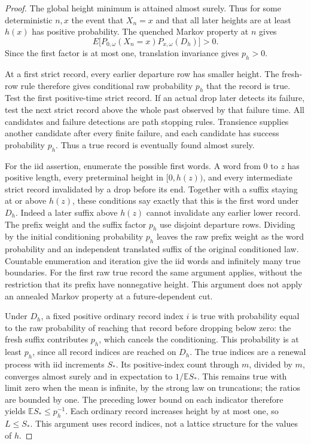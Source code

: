 \begin{proof}
The global height minimum is attained almost surely. Thus for some
deterministic \(n,x\) the event that \(X_n=x\) and that all later heights
are at least \(h(x)\) has positive probability. The quenched Markov
property at \(n\) gives
\[
E\big[P_{0,\omega}(X_n=x)P_{x,\omega}(D_h)\big]>0.
\]
Since the first factor is at most one, translation invariance gives
\(p_h>0\).

At a first strict record, every earlier departure row has smaller height.
The fresh-row rule therefore gives conditional raw probability \(p_h\)
that the record is true. Test the first positive-time strict record. If
an actual drop later detects its failure, test the next strict record
above the whole past observed by that failure time. All candidates and
failure detections are path stopping rules. Transience supplies another
candidate after every finite failure, and each candidate has success
probability \(p_h\). Thus a true record is eventually found almost surely.

For the iid assertion, enumerate the possible first words. A word from
\(0\) to \(z\) has positive length, every preterminal height in
\([0,h(z))\), and every intermediate strict record invalidated by a drop
before its end. Together with a suffix staying at or above \(h(z)\),
these conditions say exactly that this is the first word under \(D_h\).
Indeed a later suffix above \(h(z)\) cannot invalidate any earlier lower
record. The prefix weight and the suffix factor \(p_h\) use disjoint
departure rows. Dividing by the initial conditioning probability \(p_h\)
leaves the raw prefix weight as the word probability and an independent
translated suffix of the original conditioned law. Countable enumeration
and iteration give the iid words and infinitely many true boundaries.
For the first raw true record the same argument applies, without the
restriction that its prefix have nonnegative height. This argument does
not apply an annealed Markov property at a future-dependent cut.

Under \(D_h\), a fixed positive ordinary record index \(i\) is true with
probability equal to the raw probability of reaching that record before
dropping below zero: the fresh suffix contributes \(p_h\), which cancels
the conditioning. This probability is at least \(p_h\), since all record
indices are reached on \(D_h\). The true indices are a renewal process
with iid increments \(S_*\). Its positive-index count through \(m\),
divided by \(m\), converges almost surely and in expectation to
\(1/\mathbb E S_*\). This remains true with limit zero when the mean is
infinite, by the strong law on truncations; the ratios are bounded by one.
The preceding lower bound on each indicator therefore yields
\(\mathbb E S_*\le p_h^{-1}\). Each ordinary record increases height by
at most one, so \(L\le S_*\). This argument uses record indices, not a
lattice structure for the values of \(h\).
\end{proof}

